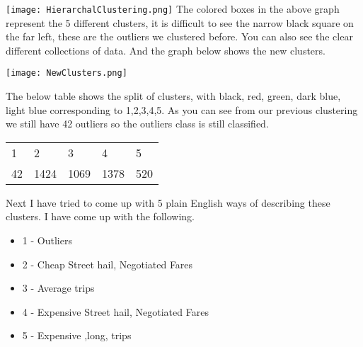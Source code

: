 \documentclass{article}
\begin{document}
\texttt{[image: HierarchalClustering.png]}
The colored boxes in the above graph represent the 5 different clusters, it is difficult to see the narrow black square on the far left, these are the outliers we clustered before. You can also see the clear different collections of data. And the graph below shows the new clusters.

\texttt{[image: NewClusters.png]}

The below table shows the split of clusters, with black, red, green, dark blue, light blue corresponding to 1,2,3,4,5. As you can see from our previous clustering we still have 42 outliers so the outliers class is still classified.

\begin{tabular}{lllll}
  1  &  2 &   3  &  4  &  5 \\
  42 & 1424 & 1069 & 1378 & 520
\end{tabular}

Next I have tried to come up with 5 plain English ways of describing these clusters. I have come up with the following.
\begin{itemize}
\item 1 - Outliers
\item 2 - Cheap Street hail, Negotiated Fares
\item 3 - Average trips
\item 4 - Expensive Street hail, Negotiated Fares
\item 5 - Expensive ,long, trips
\end{itemize}
\end{document}
